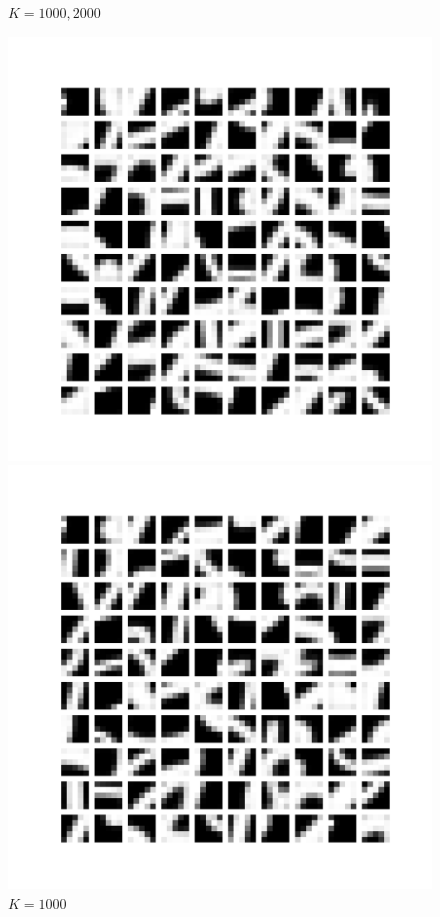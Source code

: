 \documentclass{article}
\begin{document}
\begin{itemize}
\begin{figure}[htbp!]
\begin{minipage}{0.4\textwidth}
        \caption{$K = 400$}
        \label{fig:400-centroids}
    \end{minipage}
\item $K = 1000, 2000$    
    \begin{minipage}{0.4\textwidth}
        \centering
        \includegraphics[width=\textwidth]{K-means/Result/Centroids/1000-clusters-centroids.png}
        \caption{$K = 1000$}
        \label{fig:1000-centroids}
    \end{minipage}%
    \begin{minipage}{0.4\textwidth}
        \centering
        \includegraphics[width=\textwidth]{K-means/Result/Centroids/2000-clusters-centroids.png}

\end{minipage}
\end{figure}
\end{itemize}
\end{document}
